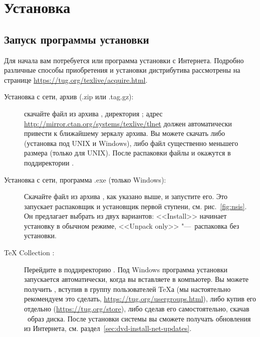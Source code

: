 \documentclass{article}
\begin{document}
\section{Установка}
\label{sec:install}

\subsection{Запуск программы установки}
\label{sec:inst-start}

Для начала вам потребуется \DVD{} \TK{} или программа установки \TL{}
с Интернета.  Подробно различные способы приобретения и установки
дистрибутива рассмотрены на странице
\url{https://tug.org/texlive/acquire.html}.

\begin{description}
\item [Установка с сети, архив  (.zip или .tag.gz):] скачайте файл из архива
  \CTAN, директория 
; адрес
\url{http://mirror.ctan.org/systems/texlive/tlnet} должен автоматически
привести к ближайшему зеркалу архива.  Вы можете скачать либо
 (установка под UNIX и Windows), либо файл
существенно меньшего размера
 (только для UNIX). После распаковки
файлы  и 
 окажутся в поддиректории .


\item[Установка с сети, программа .exe (только Windows):] Скачайте
  файл из архива \CTAN, как указано выше, и запустите его.  Это
  запускает распаковщик и установщик первой ступени,
  см. рис.~\ref{fig:nsis}.  Он предлагает выбрать из двух
  вариантов:  <<Install>> начинает установку в обычном режиме,
  <<Unpack only>> "---~распаковка без
  установки.   

\item [\TeX{} Collection \DVD:] Перейдите в поддиректорию
  . Под Windows программа установки запускается
  автоматически, когда вы вставляете \DVD{} в компьютер.  Вы можете
  получить \DVD, вступив в группу пользователей \TeX а (мы
  настоятельно рекомендуем это сделать,
  \url{https://tug.org/usergroups.html}), либо купив его отдельно
  (\url{https://tug.org/store}), либо сделав его самостоятельно, скачав
  \ISO\ образ диска.  После установки системы вы сможете получать
  обновления из Интернета,
  см. раздел~\ref{sec:dvd-install-net-updates}. 

\end{description}
\end{document}
